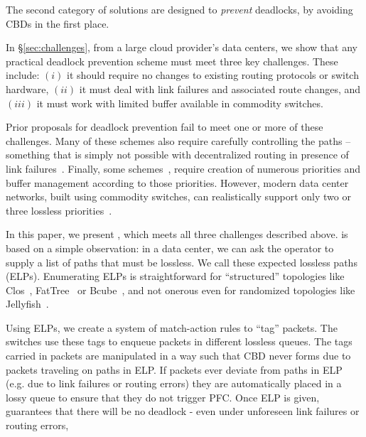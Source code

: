 The second category of solutions are designed to {\em prevent} deadlocks, by avoiding CBDs in the first place.

In \S\ref{sec:challenges},  from a large cloud provider's data
centers, we show that any practical deadlock prevention scheme must meet three
key challenges. These include: $(i)$ it should require no changes to existing
routing protocols or switch hardware, $(ii)$ it must deal with link failures and
associated  route changes, and $(iii)$ it must work with limited buffer
available in commodity switches.

Prior proposals for deadlock prevention fail to meet one or more of these
challenges. 
Many of these schemes also
require carefully controlling the paths -- something that is simply not possible
with decentralized routing in presence of link failures~\cite{netpilot}.
Finally, some schemes~\cite{firstpaper,survey,datanetworks,karol2003prevention},
require creation of numerous priorities and buffer management according to those
priorities.  However, modern data center networks, built using commodity
switches, can realistically support only two or three lossless
priorities~\cite{rdmaatscale}.

In this paper, we present \sysname{}, which meets all three challenges described
above. \sysname{} is based on a simple observation: in a data center, we can ask
the operator to supply a list of paths that must be lossless.  We call these
expected lossless paths (ELPs). Enumerating ELPs is straightforward for
``structured'' topologies like Clos~\cite{clos}, FatTree~\cite{fattree} or
Bcube~\cite{bcube}, and not onerous even for randomized topologies like
Jellyfish~\cite{jellyfish}.

Using ELPs, we create a system of match-action rules to ``tag'' packets. The
switches use these tags to enqueue packets in different lossless queues. The
tags carried in packets are manipulated in a way such that CBD never forms due
to packets traveling on paths in ELP.  If packets ever deviate from paths in ELP
(e.g. due to link failures or routing errors) they are automatically placed in a
lossy queue to ensure that they do not trigger PFC.  Once ELP is given, \sysname{} guarantees that
there will be no deadlock - even under unforeseen link failures or routing
errors, 


